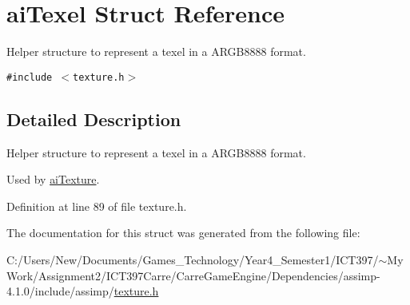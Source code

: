\hypertarget{structai_texel}{
\section{aiTexel Struct Reference}
\label{structai_texel}
}
Helper structure to represent a texel in a ARGB8888 format.  


{\tt \#include $<$texture.h$>$}



\subsection{Detailed Description}
Helper structure to represent a texel in a ARGB8888 format. 

Used by \hyperlink{structai_texture}{aiTexture}. 

Definition at line 89 of file texture.h.

The documentation for this struct was generated from the following file:\begin{CompactItemize}
\item 
C:/Users/New/Documents/Games\_\-Technology/Year4\_\-Semester1/ICT397/$\sim$My Work/Assignment2/ICT397Carre/CarreGameEngine/Dependencies/assimp-4.1.0/include/assimp/\hyperlink{texture_8h}{texture.h}\end{CompactItemize}
